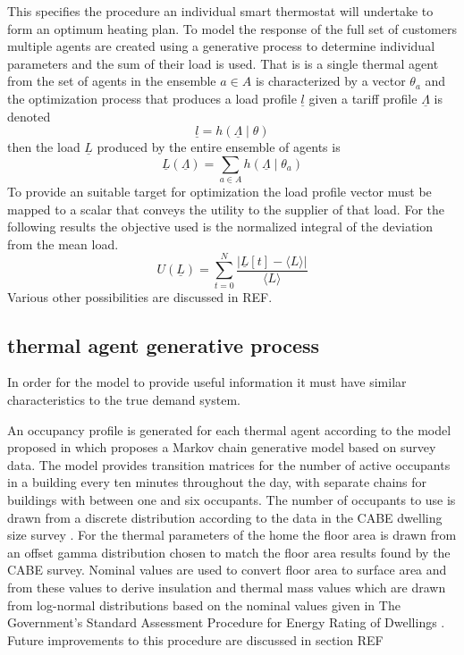\documentclass[a4paper, 10 pt, conference]{ieeeconf}  %
\begin{document}
This specifies the procedure an individual smart thermostat will undertake to form an optimum heating plan. To model the response of the full set of customers multiple agents are created using a generative process to determine individual parameters and the sum of their load is used. That is is a single thermal agent from the set of agents in the ensemble $a \in A$ is characterized by a vector $\theta_{a}$ and the optimization process that produces a load profile $\underline{l}$ given a tariff profile $\underline{\Lambda}$ is denoted
\begin{equation}
\underline{l}=h(\underline{\Lambda} \mid \theta)
\end{equation}
then the load $\underline{L}$ produced by the entire ensemble of agents is
\begin{equation}
\underline{L}(\underline{\Lambda}) = \sum_{a \in A} h(\underline{\Lambda} \mid \theta_{a})
\end{equation}
To provide an suitable target for optimization the load profile vector must be mapped to a scalar that conveys the utility to the supplier of that load. For the following results the objective used is the normalized integral of the deviation from the mean load.
\begin{equation}
U(\underline{L})=\sum_{t=0}^{N} \frac{\left| \underline{L}[t]-\langle L \rangle \right|}{\langle L \rangle}
\end{equation}
Various other possibilities are discussed in REF.
\subsection{thermal agent generative process}
In order for the model to provide useful information it must have similar characteristics to the true demand system.

An occupancy profile is generated for each thermal agent according to the model proposed in \cite{richardson2008high} which proposes a Markov chain generative model based on survey data. The model provides transition matrices for the number of active occupants in a building every ten minutes throughout the day, with separate chains for buildings with between one and six occupants. The number of occupants to use is drawn from a discrete distribution according to the data in the CABE dwelling size survey \cite{CABE}.
For the thermal parameters of the home the floor area is drawn from an offset gamma distribution chosen to match the floor area results found by the CABE survey. Nominal values are used to convert floor area to surface area and from these values to derive insulation and thermal mass values which are drawn from log-normal distributions based on the nominal values given in The Government’s Standard Assessment Procedure for Energy Rating of Dwellings \cite{SAP}. Future improvements to this procedure are discussed in section REF
\end{document}

